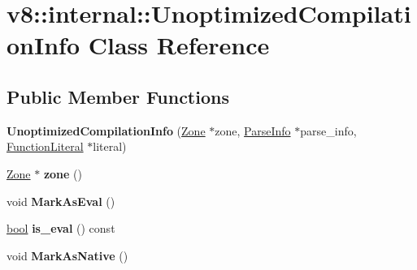 \hypertarget{classv8_1_1internal_1_1UnoptimizedCompilationInfo}{}\section{v8\+:\+:internal\+:\+:Unoptimized\+Compilation\+Info Class Reference}
\label{classv8_1_1internal_1_1UnoptimizedCompilationInfo}
\subsection*{Public Member Functions}
\begin{DoxyCompactItemize}
\item 
\mbox{\label{classv8_1_1internal_1_1UnoptimizedCompilationInfo_a66a7e11dcc9daee19d811fedc713bdde}} 
{\bfseries Unoptimized\+Compilation\+Info} (\mbox{\hyperlink{classv8_1_1internal_1_1Zone}{Zone}} $\ast$zone, \mbox{\hyperlink{classv8_1_1internal_1_1ParseInfo}{Parse\+Info}} $\ast$parse\+\_\+info, \mbox{\hyperlink{classv8_1_1internal_1_1FunctionLiteral}{Function\+Literal}} $\ast$literal)
\item 
\mbox{\label{classv8_1_1internal_1_1UnoptimizedCompilationInfo_ad20bfdbd9fe334789abb82f7e03aa491}} 
\mbox{\hyperlink{classv8_1_1internal_1_1Zone}{Zone}} $\ast$ {\bfseries zone} ()
\item 
\mbox{\label{classv8_1_1internal_1_1UnoptimizedCompilationInfo_a19ccdda88116437817f1ce93e7cec45e}} 
void {\bfseries Mark\+As\+Eval} ()
\item 
\mbox{\label{classv8_1_1internal_1_1UnoptimizedCompilationInfo_a6851bc84cae40eef4db8082172f737cf}} 
\mbox{\hyperlink{classbool}{bool}} {\bfseries is\+\_\+eval} () const
\item 
\mbox{\label{classv8_1_1internal_1_1UnoptimizedCompilationInfo_aa9321a101216132d0f05d5ca6bf509f1}} 
void {\bfseries Mark\+As\+Native} ()
\item 
\mbox{\label{classv8_1_1internal_1_1UnoptimizedCompilationInfo_a0892797e1a87c1a9f36ddda545730a4e}} 

\end{DoxyCompactItemize}
